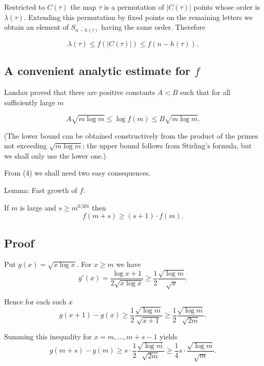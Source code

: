 \documentclass[12pt,a4paper]{article}
\theoremstyle{definition}
\begin{document}
    Restricted to $C(\tau)$ the map $\tau$ is a permutation of $|C(\tau)|$ points whose order is $\lambda(\tau)$.
    Extending this permutation by fixed points on the remaining letters we obtain an element
    of $S_{n-h(\tau)}$ having the same order. Therefore

    \begin{equation}
        \lambda(\tau) \leq f(|C(\tau)|) \leq f(n - h(\tau)).
    \end{equation}


    \subsection*{A convenient analytic estimate for $f$}

    Landau proved that there are positive constants $A < B$ such that for all sufficiently large $m$

    \begin{equation}
        A\sqrt{m \log m} \leq \log f(m) \leq B\sqrt{m \log m}.
    \end{equation}

    (The lower bound can be obtained constructively from the product of the primes not exceeding
    $\sqrt{m \log m}$; the upper bound follows from Stirling's formula, but we shall only use the
    lower one.)

    From (4) we shall need two easy consequences.

    Lemma: Fast growth of $f$.

        If $m$ is large and $s \geq m^{0.501}$ then
        \begin{equation}
            f(m+s) \geq (s+1) \cdot f(m).
        \end{equation}

\subsection*{Proof}
    Put $g(x) = \sqrt{x \log x}$. For $x \geq m$ we have
        $$g'(x) = \frac{\log x + 1}{2\sqrt{x \log x}} \geq \frac{1}{2}\frac{\sqrt{\log m}}{\sqrt{x}}.$$

        Hence for each such $x$
        $$g(x+1) - g(x) \geq \frac{1}{2}\frac{\sqrt{\log m}}{\sqrt{x+1}} \geq \frac{1}{2}\frac{\sqrt{\log m}}{\sqrt{2m}}.$$

        Summing this inequality for $x = m, \ldots, m+s-1$ yields
        \begin{equation}
            g(m+s) - g(m) \geq s \cdot \frac{1}{2}\frac{\sqrt{\log m}}{\sqrt{2m}} \geq \frac{1}{4}s \cdot \frac{\sqrt{\log m}}{\sqrt{m}}.
        \end{equation}
\end{document}
